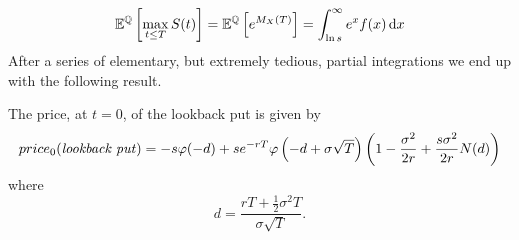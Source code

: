 \begin{equation}
    \mathbb{E}^{\mathbb{Q}}\left[\max_{t\le T}S(t)\right] = \mathbb{E}^{\mathbb{Q}}\left[e^{M_X(T)}\right] = \int_{\ln s}^{\infty}e^x f(x)\,\dd x
\end{equation}
After a series of elementary, but extremely tedious, partial integrations we end up with the following result.
\begin{proposition}
    The price, at $t=0$, of the lookback put is given by
    \begin{equation}
        price_0(\mbox{\emph{lookback put}}) = -s\varphi(-d) + se^{-rT}\varphi\left(-d+\sigma\sqrt{T}\right)\left(1-\frac{\sigma^2}{2r}+ \frac{s\sigma^2}{2r}N(d)\right)
    \end{equation}
    where
    \begin{equation}
        d = \frac{rT + \tfrac{1}{2}\sigma^2 T}{\sigma\sqrt{T}}.
    \end{equation}
\end{proposition}
